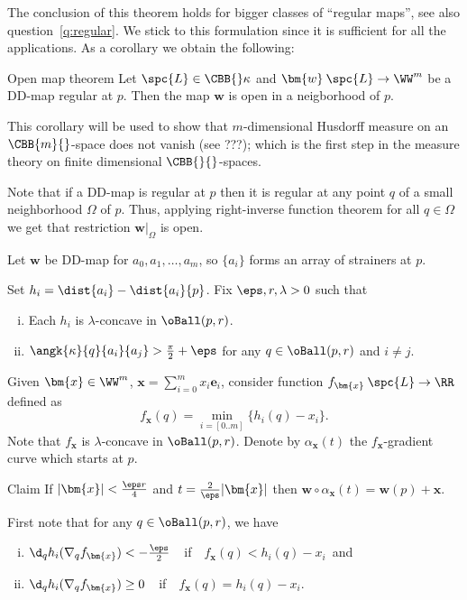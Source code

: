 The conclusion of this theorem holds for bigger classes of ``regular maps'', see also question~\ref{q:regular}.
We stick to this formulation since
it is sufficient for all the applications.
As a corollary we obtain the following:

\begin{thm}{Open map theorem}\label{thm:open-map}
Let $\spc{L}\in\CBB{}\kappa$ and ${\bm{w}}\:\spc{L}\to \WW^m$ be a DD-map regular at $p$.
Then the map ${\bm{w}}$ is open in a neigborhood of $p$.
\end{thm}

This corollary will be used to show that $m$-dimensional Husdorff measure on an $\CBB{m}{}$-space does not vanish (see ???); 
which is the first step in the measure theory on finite dimensional $\CBB{}{}$-spaces.

Note that if a DD-map is regular at $p$ then it is regular at any point $q$ of a small neighborhood $\Omega$ of $p$.
Thus, applying right-inverse function theorem for all $q\in \Omega$ we get that restriction ${\bm{w}}|_{\Omega}$ is open.
\qeds


Let ${\bm{w}}$ be DD-map for $a_0,a_1,\dots,a_m$, so $\{a_i\}$ forms an array of strainers at $p$.

Set $h_i=\dist{a_i}-\dist{a_i}{p}$.
Fix $\eps,r,\lambda>0$ such that 
\begin{enumerate}[(i)]
\item Each $h_i$ is $\lambda$-concave in $\oBall(p,r)$.
\item $\angk{\kappa}{q}{a_i}{a_j}>\tfrac\pi2+\eps$ for any $q\in \oBall(p,r)$ and $i\not=j$.
\end{enumerate}


Given $\bm{x}\in \WW^m$, $\bm{x}=\sum_{i=0}^m x_i\bm{e}_i$, consider  function 
$f_{\bm{x}}\:\spc{L}\to \RR$ defined as
$$f_{\bm{x}}(q)=\min_{i=[0..m]}\{h_i(q)-x_i\}.$$
Note that $f_{\bm{x}}$ is $\lambda$-concave in $\oBall(p,r)$.
Denote by $\alpha_{\bm{x}}(t)$ the $f_{\bm{x}}$-gradient curve which starts at $p$.

\begin{thm}{Claim}
If $|\bm{x}|<\tfrac{\eps r}{4}$ and $t= \tfrac{2}\eps|\bm{x}|$ then 
${\bm{w}}\circ\alpha_{\bm{x}}(t)={\bm{w}}(p)+\bm{x}$.
\end{thm}

First note that for any $q\in \oBall(p,r)$, we have
\begin{enumerate}[(i)]
\item%
$\d_q h_i(\nabla_q f_{\bm{x}})<-\frac\eps2$\ \ if\ \  $f_{\bm{x}}(q)<h_i(q)-x_i$\  and
\item
$\d_qh_i(\nabla_q f_{\bm{x}})\ge 0$\ \  if\ \  $f_{\bm{x}}(q)=h_i(q)-x_i$.
\end{enumerate}

